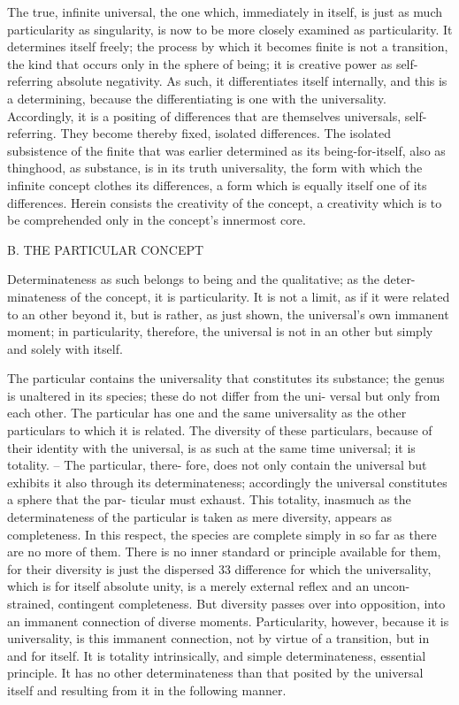 The true, infinite universal, the one
which, immediately in itself, is
just as much particularity as singularity,
is now to be more closely examined as particularity.
It determines itself freely;
the process by which it becomes finite
is not a transition,
the kind that occurs only in the sphere of being;
it is creative power as self-referring absolute negativity.
As such, it differentiates itself internally,
and this is a determining,
because the differentiating is
one with the universality.
Accordingly, it is a positing of differences
that are themselves universals, self-referring.
They become thereby fixed, isolated differences.
The isolated subsistence of the finite
that was earlier determined as its being-for-itself,
also as thinghood, as substance, is
in its truth universality,
the form with which the infinite concept
clothes its differences,
a form which is equally itself one of its differences.
Herein consists the creativity of the concept,
a creativity which is to be comprehended
only in the concept's innermost core.

B. THE PARTICULAR CONCEPT

Determinateness as such belongs to being and the qualitative; as the deter-
minateness of the concept, it is particularity. It is not a limit, as if it were
related to an other beyond it, but is rather, as just shown, the universal's
own immanent moment; in particularity, therefore, the universal is not in
an other but simply and solely with itself.

The particular contains the universality that constitutes its substance;
the genus is unaltered in its species; these do not differ from the uni-
versal but only from each other. The particular has one and the same
universality as the other particulars to which it is related. The diversity
of these particulars, because of their identity with the universal, is as
such at the same time universal; it is totality. – The particular, there-
fore, does not only contain the universal but exhibits it also through its
determinateness; accordingly the universal constitutes a sphere that the par-
ticular must exhaust. This totality, inasmuch as the determinateness of
the particular is taken as mere diversity, appears as completeness. In this
respect, the species are complete simply in so far as there are no more
of them. There is no inner standard or principle available for them, for
their diversity is just the dispersed 33 difference for which the universality,
which is for itself absolute unity, is a merely external reflex and an uncon-
strained, contingent completeness. But diversity passes over into opposition,
into an immanent connection of diverse moments. Particularity, however,
because it is universality, is this immanent connection, not by virtue of
a transition, but in and for itself. It is totality intrinsically, and simple
determinateness, essential principle. It has no other determinateness than
that posited by the universal itself and resulting from it in the following
manner.

